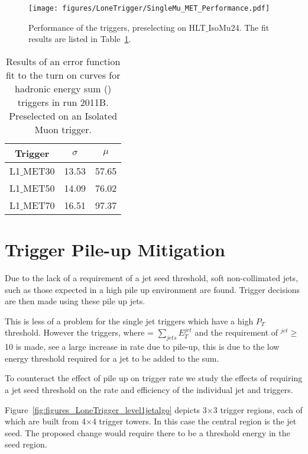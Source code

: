 \begin{figure}[ht]
  \centering
    \texttt{[image: figures/LoneTrigger/SingleMu\_MET\_Performance.pdf]}
  \caption{Performance of the \Lone \MET triggers, preselecting on 
  HLT$\_$IsoMu24. The fit results are listed in 
  Table~\ref{tab:2011B_MET_performance}.}
  \label{fig:figures_SingleMu_MET_Performance}
\end{figure}


\begin{table}[ht]
 \centering
\begin{tabular}{|c|c|c|}
\hline
\hline
Trigger & $\sigma$ & $\mu$\\
\hline
L1$\_$MET30 & 13.53 & 57.65 \\
\hline
L1$\_$MET50 & 14.09 & 76.02 \\
\hline
L1$\_$MET70 & 16.51 & 97.37 \\
\hline
\hline
\end{tabular}
\caption{Results of an error function fit to the turn on curves for \Lone 
hadronic energy sum (\MET) triggers in run 2011B. Preselected on an Isolated Muon trigger.}
\label{tab:2011B_MET_performance}
\end{table}

\clearpage
\section{\Lone Trigger Pile-up Mitigation} %
\label{sub:lone_trigger_pile_up_mitigation}
Due to the lack of a requirement of a jet seed threshold, soft non-collimated 
jets, such as those expected in a high pile up environment are found. Trigger 
decisions are then made using these pile up jets.

This is less of a problem for the single jet triggers which have a high $P_{T}$ 
threshold. However the \HT triggers, where \HT = $\sum_{jets}E_{T}^{jet}$ and 
the requirement of \ET$^{jet} \geq $10 \GeV is made, see a large increase in 
rate due to pile-up, this is due to the low energy  threshold required for a 
jet to be added to the \HT sum.

To counteract the effect of pile up on trigger rate we study the effects of 
requiring a jet seed threshold on the rate and efficiency of the individual jet 
and \HT triggers.

Figure~\ref{fig:figures_LoneTrigger_level1jetalgo} depicts 3$\times$3 trigger
regions, each of which are built from 4$\times$4 trigger towers. In this case 
the central region is the jet seed. The proposed change would require there to 
be a threshold energy in the seed region.





